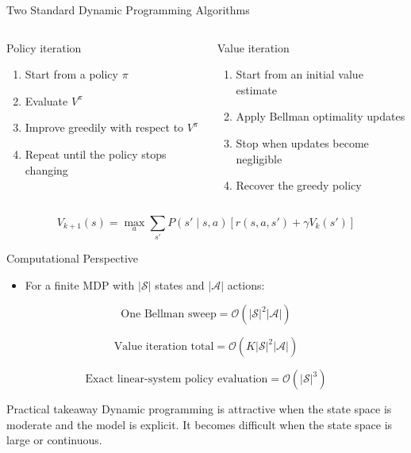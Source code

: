 \documentclass[aspectratio=169,11pt]{beamer}
\begin{document}
\begin{frame}{Two Standard Dynamic Programming Algorithms}
  \begin{columns}[T]
    \begin{block}{Policy iteration}
      \begin{enumerate}
        \item Start from a policy \(\pi\)
        \item Evaluate \(V^{\pi}\)
        \item Improve greedily with respect to \(V^{\pi}\)
        \item Repeat until the policy stops changing
      \end{enumerate}
    \end{block}

    \begin{block}{Value iteration}
      \begin{enumerate}
        \item Start from an initial value estimate
        \item Apply Bellman optimality updates
        \item Stop when updates become negligible
        \item Recover the greedy policy
      \end{enumerate}
    \end{block}
  \end{columns}

  \vspace{0.2cm}
  \[
    V_{k+1}(s) = \max_{a} \sum_{s'} P(s' \mid s,a)\left[r(s,a,s') + \gamma V_k(s')\right]
  \]
\end{frame}

\begin{frame}{Computational Perspective}
  \begin{itemize}
    \item For a finite MDP with \(|\mathcal{S}|\) states and \(|\mathcal{A}|\) actions:
  \end{itemize}

  \[
    \text{One Bellman sweep} = \mathcal{O}(|\mathcal{S}|^2 |\mathcal{A}|)
  \]

  \[
    \text{Value iteration total} = \mathcal{O}(K |\mathcal{S}|^2 |\mathcal{A}|)
  \]

  \[
    \text{Exact linear-system policy evaluation} = \mathcal{O}(|\mathcal{S}|^3)
  \]

  \begin{block}{Practical takeaway}
    Dynamic programming is attractive when the state space is moderate and the model is explicit. It becomes difficult when the state space is large or continuous.
  \end{block}
\end{frame}
\end{document}
